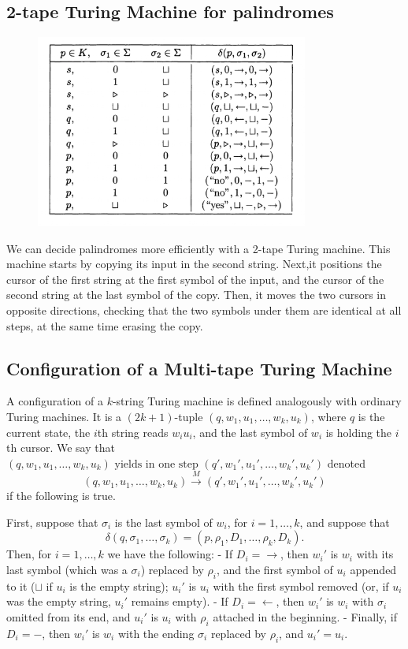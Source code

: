 \documentclass[12pt]{article}
\begin{document}
\subsection{2-tape Turing Machine for palindromes}
  \begin{figure}[h]
    \centering
    \includegraphics[width=0.8\textwidth]{img/2kTM_palindrom.png}
  \end{figure}
  We can decide palindromes more efficiently with a 2-tape Turing machine. This machine starts by copying its input in the second string. Next,it positions the cursor of the first string at the first symbol of the input, and the cursor of the second string at the last symbol of the copy. Then, it moves the two cursors in opposite directions, checking that the two symbols under them are identical at all steps, at the same time erasing the copy.
  

\subsection{Configuration of a Multi-tape Turing Machine}

A configuration of a $k$-string Turing machine is defined analogously with ordinary Turing machines. It is a $(2k + 1)$-tuple $(q, w_1, u_1, \ldots, w_k, u_k)$, where $q$ is the current state, the $i$th string reads $w_i u_i$, and the last symbol of $w_i$ is holding the $i$th cursor. We say that 
$(q, w_1, u_1, \ldots, w_k, u_k) \text{ yields in one step } (q', w_1', u_1', \ldots, w_k', u_k')$ denoted 
$$(q, w_1, u_1, \ldots, w_k, u_k) \xrightarrow{M} (q', w_1', u_1', \ldots, w_k', u_k')$$
if the following is true. 

First, suppose that $\sigma_i$ is the last symbol of $w_i$, for $i = 1, \ldots, k$, and suppose that 
\[
\delta(q, \sigma_1, \ldots, \sigma_k) = (p, \rho_1, D_1, \ldots, \rho_k, D_k).
\]
Then, for $i = 1, \ldots, k$ we have the following:
- If $D_i = \rightarrow$, then $w_i'$ is $w_i$ with its last symbol (which was a $\sigma_i$) replaced by $\rho_i$, and the first symbol of $u_i$ appended to it ($\sqcup$ if $u_i$ is the empty string); $u_i'$ is $u_i$ with the first symbol removed (or, if $u_i$ was the empty string, $u_i'$ remains empty).
- If $D_i = \leftarrow$, then $w_i'$ is $w_i$ with $\sigma_i$ omitted from its end, and $u_i'$ is $u_i$ with $\rho_i$ attached in the beginning.
- Finally, if $D_i = -$, then $w_i'$ is $w_i$ with the ending $\sigma_i$ replaced by $\rho_i$, and $u_i' = u_i$.
\end{document}
